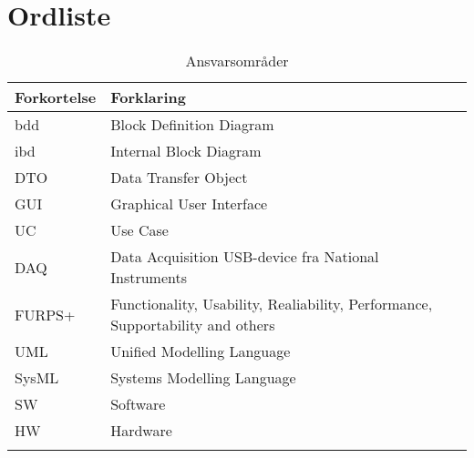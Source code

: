\chapter{Ordliste}


\begin{longtabu} to 
	\textbf{Forkortelse} & \textbf{Forklaring} \\[-1ex]
	\midrule
	 bdd & Block Definition Diagram \\[-1ex]
	 ibd & Internal Block Diagram \\[-1ex]
	 DTO & Data Transfer Object \\[-1ex]
	 GUI & Graphical User Interface \\[-1ex]
	 UC  & Use Case \\[-1ex]
	 DAQ & Data Acquisition USB-device fra National Instruments \\[-1ex]
	 FURPS+ & Functionality, Usability, Realiability, Performance, Supportability and others\\[-1ex]
	 UML & Unified Modelling Language \\[-1ex]
	 SysML & Systems Modelling Language \\[-1ex]
	 SW & Software \\[-1ex]
	 HW & Hardware \\[-1ex]


	\caption{Ansvarsområder}
\end{longtabu}
